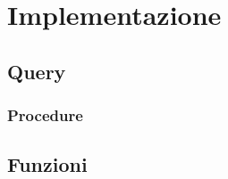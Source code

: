\section{Implementazione}




\subsection{Query} %
\subsubsection{Procedure}

\begin{comment}
    operazione 3: stampa il nome e la quantità di tutti i cibi con data di scadenza al 10/12/2016
    opearzione 4: stampa la marca e il tipo di tutti i  vini o superalcolici, con annata risalente al 1987
    opearzione 5: stampa nome e PartitaIVA di tutti i fornitori che vendono almeno 2 cibi con tipo "fresco"
    opearzione 6: stampa il codice e il costo di tutte le uscite con causale "acqua" in data 3/6/2015
    opearzione 7: stampa il codice e il costo di tutte le entrate del giorno 21/10/2016
    opearzione 8: stampa il codice e il numero di persone di tutti gli ordini serviti dalla cameriera "Anna" il giorno 15/04/2015 al tavolo "18" 
    operazione 9: stampa il numero di tutti i tavoli prenotati il giorno 31/12/2016 
    operazione 12: stampa il codice di tutte le prenotazioni per il tavolo numero 5 il giorno 24/08/2015
    operazione 16: stampa nome cognome di tutti i dipendenti di turno il lunedì
\end{comment}

\subsection{Funzioni} %

